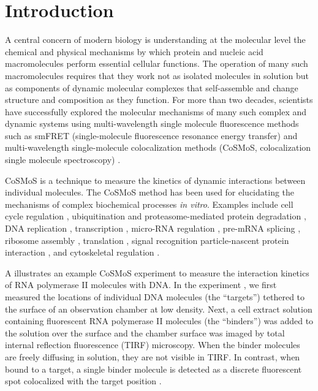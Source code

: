 \section{Introduction}

A central concern of modern biology is understanding at the molecular level the chemical and physical mechanisms by which protein and nucleic acid macromolecules  perform essential cellular functions.  The operation of many such macromolecules requires that they work not as isolated molecules in solution but as components of dynamic molecular complexes that self-assemble and change structure and composition as they function.  For more than  two decades, scientists have successfully explored the molecular mechanisms of many such complex and dynamic systems using multi-wavelength single molecule fluorescence methods such as smFRET (single-molecule fluorescence resonance energy transfer) \citep{Roy2008-fo} and multi-wavelength single-molecule colocalization methods (CoSMoS, colocalization single molecule spectroscopy) \citep{Larson2014-os, Van_Oijen2011-ig,Friedman2012-if}.

CoSMoS is a technique to measure the kinetics of dynamic interactions between individual molecules.  The CoSMoS method has been used for elucidating the mechanisms of complex biochemical processes \textit{in vitro}. Examples include cell cycle regulation \citep{Lu2015-eu}, ubiquitination and proteasome-mediated protein degradation \citep{Lu2015-jq}, DNA replication \citep{Geertsema2014-bt,Ticau2015-ib}, transcription \citep{Zhang2012-no,Friedman2012-if,Friedman2013-sf}, micro-RNA regulation \citep{Salomon2015-kq}, pre-mRNA splicing \citep{Shcherbakova2013-bi, Krishnan2013-fy, Warnasooriya2014-ls}, ribosome assembly \citep{Kim2014-zc}, translation \citep{Wang2015-tt,Tsai2014-mi,OLeary2013-wo}, signal recognition particle-nascent protein interaction \citep{Noriega2014-vj}, and cytoskeletal regulation \citep{Smith2013-qj,Breitsprecher2012-mj}. 

A illustrates an example CoSMoS experiment to measure the interaction kinetics of RNA polymerase II molecules with DNA. In the experiment \citep{Rosen2020-zn}, we first measured the locations of individual DNA molecules (the ``targets'') tethered to the surface of an observation chamber at low density. Next, a cell extract solution containing fluorescent RNA polymerase II molecules (the ``binders'') was added to the solution over the surface and the chamber surface was imaged by total internal reflection fluorescence (TIRF) microscopy. When the binder molecules are freely diffusing in solution, they are not visible in TIRF. In contrast, when bound to a target, a single binder molecule is detected as a discrete fluorescent spot colocalized with the target position \citep{Friedman2006-kb, Friedman2015-nx}.

